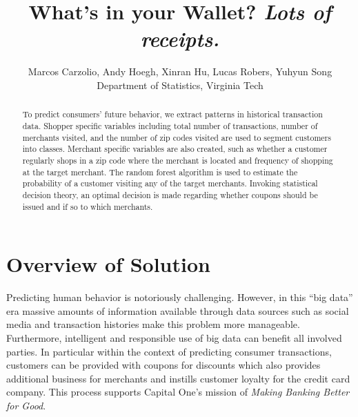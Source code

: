 \documentclass[12pt]{article} %
\begin{document}
\def\spacingset#1{\renewcommand{\baselinestretch}%
{#1}\small\normalsize} \spacingset{1}
\newcommand{\ac}[1]{[{\color{red}\ Andy Says: {\tt #1}}]}
\newcommand{\xc}[1]{[{\color{red}\ Xinran Says: {\tt #1}}]}
\newcommand{\lc}[1]{[{\color{red}\ Lucas Says: {\tt #1}}]}
\newcommand{\mc}[1]{[{\color{red}\ Marcos Says: {\tt #1}}]}
\newcommand{\yc}[1]{[{\color{red}\ Yuhyun Says: {\tt #1}}]}







  \title{\bf What's in your Wallet? \emph{ Lots of receipts.}}
  \author{Marcos Carzolio, Andy Hoegh, Xinran Hu, Lucas Robers, Yuhyun Song\\ Department of Statistics, Virginia Tech}
 \maketitle
\bigskip
\begin{abstract}
\noindent
To predict consumers' future behavior, we extract patterns in historical transaction data.  Shopper specific variables including total number of transactions, number of merchants visited, and the number of zip codes visited are used to segment customers into classes.  Merchant specific variables are also created, such as whether a customer regularly shops in a zip code where the merchant is located and frequency of shopping at the target merchant.  The random forest algorithm is used to estimate the probability of a customer visiting any of the target merchants.  Invoking statistical decision theory, an optimal decision is made regarding whether coupons should be issued and if so to which merchants.
\end{abstract}


\newpage


\section{Overview of Solution} 
Predicting human behavior is notoriously challenging.  However, in this ``big data'' era massive amounts of information available through data sources such as social media and transaction histories make this problem more manageable.  Furthermore, intelligent and responsible use of big data can benefit all involved parties.  In particular within the context of predicting consumer transactions, customers can be provided with coupons for discounts which also provides additional business for merchants and instills customer loyalty for the credit card company.  This process supports Capital One's mission of \emph{Making Banking Better for Good}.  
\end{document}
